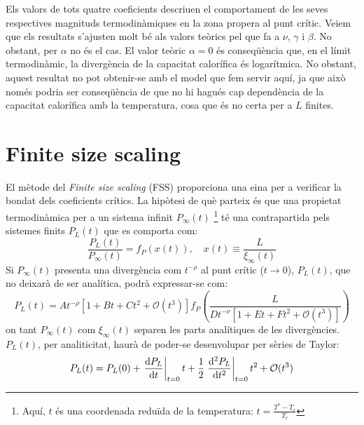 \documentclass[a4paper]{article}
\begin{document}
Els valors de tots quatre coeficients descriuen el comportament de les seves respectives magnituds termodinàmiques en la zona propera al punt crític. Veiem que els resultats s'ajusten molt bé als valors teòrics pel que fa a $\nu$, $\gamma$ i $\beta$. No obstant, per $\alpha$ no és el cas. El valor teòric $\alpha=0$ és conseqüència que, en el límit termodinàmic, la divergència de la capacitat calorífica és logarítmica. No obstant, aquest resultat no pot obtenir-se amb el model que fem servir aquí, ja que això només podria ser conseqüència de que no hi hagués cap dependència de la capacitat calorífica amb la temperatura, cosa que és no certa per a $L$ finites.

\section{Finite size scaling}

El mètode del \textit{Finite size scaling} (FSS) proporciona una eina per a verificar la bondat dels coeficients crítics. La hipòtesi de què parteix és que una propietat termodinàmica per a un sistema infinit $P_\infty (t)$ \footnote{Aquí, $t$ és una coordenada reduïda de la temperatura: $t = \frac{T^* - T_c}{T_c}$} té una contrapartida pels sistemes finits $P_L (t)$ que es comporta com:
\begin{equation*}
    \frac{P_L(t)}{P_\infty (t)} = f_P \left(x(t) \right), \quad x(t) \equiv \frac{L}{\xi_\infty (t)}
\end{equation*}
Si $P_\infty (t)$ presenta una divergència com $t^{-\rho}$ al punt crític ($t \to 0$), $P_L (t)$, que no deixarà de ser analítica, podrà expressar-se com:
\begin{equation*}
    P_L (t) = A t^{-\rho}\left[ 1 + Bt + Ct^2 + \mathcal{O}(t^3) \right] f_P \left( \frac{L}{D t^{-\nu} \left[ 1 + Et + Ft^2 + \mathcal{O}(t^3) \right]} \right)
\end{equation*}
on tant $P_\infty (t)$ com $\xi_\infty (t)$ separen les parts analítiques de les divergències. $P_L (t)$, per analiticitat, haurà de poder-se desenvolupar per sèries de Taylor:
\begin{equation*}
    P_L (t) = P_L (0) + \left.\dv{P_L}{t} \right|_{t=0} t + \frac{1}{2} \left.\dv[2]{P_L}{t} \right|_{t=0} t^2 + \mathcal{O}(t^3)
\end{equation*}
\end{document}
